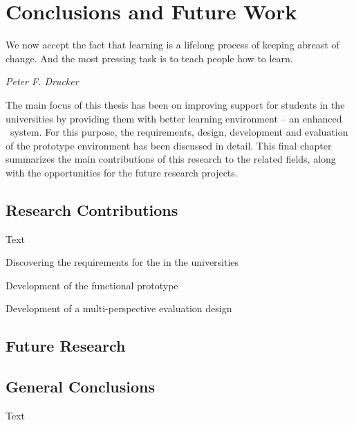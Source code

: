 \chapter{Conclusions and Future Work\label{cha:conclusion}}
\epigraph{We now accept the fact that learning is a lifelong process of keeping
abreast of change. And the most pressing task is to teach people how to
learn.}{\textit{Peter F. Drucker}}

The main focus of this thesis has been on improving \LLLs support for students
in the universities by providing them with better learning environment -- an
enhanced \ep~system. For this purpose, the requirements, design, development and
evaluation of the prototype environment has been discussed in detail. This final
chapter summarizes the main contributions of this research to the related
fields, along with the opportunities for the future research projects.

\section{Research Contributions}

Text

Discovering the requirements for the \LLLs in the universities

Development of the functional prototype

Development of a multi-perspective evaluation design

\section{Future Research}


\section{General Conclusions}

Text